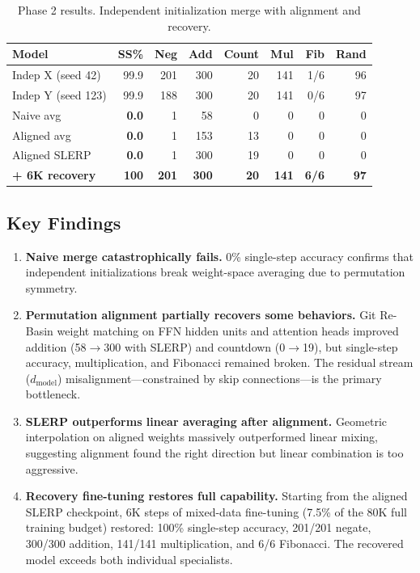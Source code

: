 \documentclass[11pt,a4paper]{article}
\begin{document}
\begin{table}[h]
\centering
\caption{Phase 2 results. Independent initialization merge with alignment and recovery.}
\label{tab:phase2}
\begin{tabular}{@{}lrrrrrrr@{}}
\toprule
Model & SS\% & Neg & Add & Count & Mul & Fib & Rand \\
\midrule
Indep X (seed 42) & 99.9 & 201 & 300 & 20 & 141 & 1/6 & 96 \\
Indep Y (seed 123) & 99.9 & 188 & 300 & 20 & 141 & 0/6 & 97 \\
\midrule
Naive avg & \textbf{0.0} & 1 & 58 & 0 & 0 & 0 & 0 \\
Aligned avg & \textbf{0.0} & 1 & 153 & 13 & 0 & 0 & 0 \\
Aligned SLERP & \textbf{0.0} & 1 & 300 & 19 & 0 & 0 & 0 \\
\midrule
\textbf{+ 6K recovery} & \textbf{100} & \textbf{201} & \textbf{300} & \textbf{20} & \textbf{141} & \textbf{6/6} & \textbf{97} \\
\bottomrule
\end{tabular}
\end{table}

\subsection{Key Findings}

\begin{enumerate}
    \item \textbf{Naive merge catastrophically fails.} 0\% single-step accuracy confirms that independent initializations break weight-space averaging due to permutation symmetry.

    \item \textbf{Permutation alignment partially recovers some behaviors.} Git Re-Basin weight matching on FFN hidden units and attention heads improved addition (58$\to$300 with SLERP) and countdown (0$\to$19), but single-step accuracy, multiplication, and Fibonacci remained broken. The residual stream ($d_\text{model}$) misalignment---constrained by skip connections---is the primary bottleneck.

    \item \textbf{SLERP outperforms linear averaging after alignment.} Geometric interpolation on aligned weights massively outperformed linear mixing, suggesting alignment found the right direction but linear combination is too aggressive.

    \item \textbf{Recovery fine-tuning restores full capability.} Starting from the aligned SLERP checkpoint, 6K steps of mixed-data fine-tuning (7.5\% of the 80K full training budget) restored: 100\% single-step accuracy, 201/201 negate, 300/300 addition, 141/141 multiplication, and 6/6 Fibonacci. The recovered model exceeds both individual specialists.
\end{enumerate}
\end{document}

